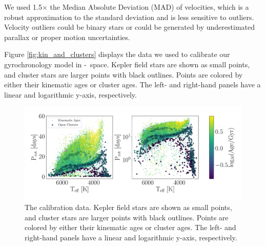 We used 1.5$\times$ the Median Absolute Deviation (MAD) of velocities, which
is a robust approximation to the standard deviation and is less sensitive to
outliers.
Velocity outliers could be binary stars or could be generated by
underestimated parallax or proper motion uncertainties.

Figure \ref{fig:kin_and_clusters} displays the data we used to calibrate our
gyrochronology model in \prot-\teff\ space.
Kepler field stars are shown as small points, and cluster stars are larger
points with black outlines.
Points are colored by either their kinematic ages or cluster ages.
The left- and right-hand panels have a linear and logarithmic y-axis,
respectively.

\begin{figure}
\caption{
    The calibration data.
Kepler field stars are shown as small points, and cluster stars are larger
points with black outlines.
Points are colored by either their kinematic ages or cluster ages.
The left- and right-hand panels have a linear and logarithmic y-axis,
respectively.
}
  \centering \includegraphics[width=1\textwidth]{kin_and_clusters_log_lin}
\end{figure}
